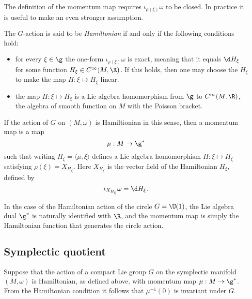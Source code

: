 \documentclass{worksheetclass}
\begin{document}
        The definition of the momentum map requires $\iota_{\rho(\xi)}\omega$ to be closed. In practice it is useful to make an even stronger assumption.
        \begin{defn}
            The $G$-action is said to be \emph{Hamiltonian} if and only if the following conditions hold:
            \begin{itemize}
                \item for every $\xi\in\g$ the one-form $\iota_{\rho(\xi)}\omega$ is exact, meaning that it equals $\d H_{\xi}$ for some function $H_\xi\in C^\infty(M,\R)$. If this holds, then one may choose the $H_\xi$ to make the map $H:\xi\mapsto H_\xi$ linear.
                \item the map $H:\xi\mapsto H_\xi$ is a Lie algebra homomorphism from $\g$ to $C^\infty(M,\R)$, the algebra of smooth function on $M$ with the Poisson bracket.
            \end{itemize}
        \end{defn}

        If the action of $G$ on $(M,\omega)$ is Hamiltionian in this sense, then a momentum map is a map
        \begin{equation}
            \mu:M\to\g^*
        \end{equation}
        such that writing $H_\xi=\langle\mu,\xi\rangle$ defines a Lie algebra homomorphism $H:\xi\mapsto H_\xi$ satisfying $\rho(\xi)=X_{H_\xi}$. Here $X_{H_\xi}$ is the vector field of the Hamiltonian $H_\xi$, defined by
        \begin{equation}
            \iota_{X_{H_\xi}}\omega=\d H_\xi.
        \end{equation}

        \begin{examp}
            In the case of the Hamiltonian action of the circle $G=\U(1)$, the Lie algebra dual $\g^*$ is naturally identified with $\R$, and the momentum map is simply the Hamiltonian function that generates the circle action.
        \end{examp}

    \subsection{Symplectic quotient}\label{sec:symplecticquotient}

        Suppose that the action of a compact Lie group $G$ on the symplectic manifold $(M,\omega)$ is Hamiltonian, as defined above, with momentum map $\mu:M\to\g^*$. From the Hamiltonian condition it follows that $\mu^{-1}(0)$ is invariant under $G$.
\end{document}
